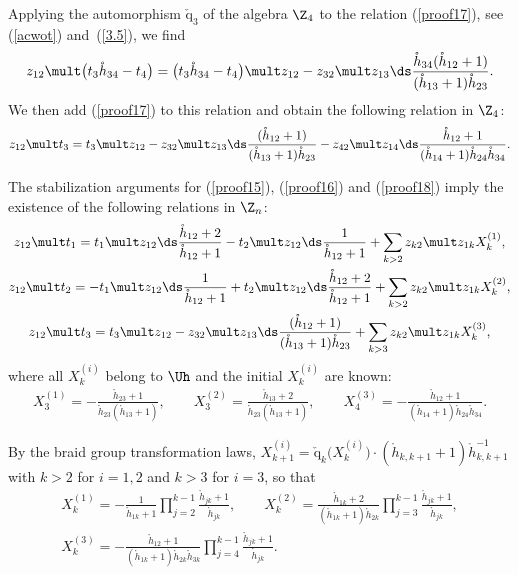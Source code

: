 \documentclass[11pt]{article}
\def\nplus{\mathfrak{n}}\def\nn{\nonumber}\def\nin{\noindent}
\def\q{\check{\mathrm q}}\def\Q{\mathrm{Q}}\def\r#1{(\ref{#1})}\let\rf=\r
\def\s{z}\def\S{\mathrm {S}}\def\si{\sigma}\def\Sp{\S^{\nplus}}\def\sy{\acute{\sigma}}\def\th{\mathring{h}}
\numberwithin{equation}{section}
\begin{document}
Applying the automorphism $\q_3$ of the algebra $\Z_4$ to the relation \rf{proof17}, see \rf{acwot} and~\rf{3.5}, we f\/ind
\begin{gather*}
\s_{12}\mult\big(t_3\th_{34}-t_4\big)=\big(t_3\th_{34}-t_4\big)\mult \s_{12}
-\s_{32}\mult\s_{13}  {\ds\frac{\th_{34}(\th_{12}+1)}{(\th_{13}+1)\th_{23}}}  .
\end{gather*}
We then add \rf{proof17} to this relation  and obtain the following relation in $\Z_4$:
\begin{gather}\label{proof18}
\s_{12}\mult t_3=t_3\mult\s_{12}
-\s_{32}\mult \s_{13}  {\ds\frac{(\th_{12}+1)}{(\th_{13}+1)\th_{23}}}-
\s_{42}\mult\s_{14}  {\ds\frac{\th_{12}+1}{(\th_{14}+1)\th_{24}\th_{34}}}  .
\end{gather}

The stabilization arguments for \rf{proof15}, \rf{proof16} and \rf{proof18} imply the existence of the following relations in $\Z_n$:
\begin{gather}\label{proof19}\s_{12}\mult t_1 =t_1\mult\s_{12}  {\ds\frac{\th_{12}+2}{\th_{12}+1}}-
t_2\mult\s_{12}  {\ds\frac{1}{\th_{12}+1}}+\sum_{k>2}\s_{k2}\mult\s_{1k}X_k^{(1)},\\
 \label{proof20}\s_{12}\mult t_2 =-t_1\mult\s_{12}  {\ds\frac{1}{\th_{12}+1}}+t_2\mult\s_{12}  {\ds\frac{\th_{12}+2}{\th_{12}+1}}
+\sum_{k>2}\s_{k2}\mult\s_{1k}X_k^{(2)},
\\
\label{proof21}\s_{12}\mult t_3 =t_3\mult\s_{12}-\s_{32}\mult\s_{13}  {\ds\frac{(\th_{12}+1)}{(\th_{13}+1)\th_{23}}}
+\sum_{k>3}\s_{k2}\mult\s_{1k}X_k^{(3)},
\end{gather}
where all $X_k^{(i)}$ belong to $\Uh$ and the initial $X_k^{(i)}$ are known:
\begin{gather*} X_3^{(1)} =-\frac{\th_{23}+1}{\th_{23}(\th_{13}+1)}  ,\qquad
X_3^{(2)} =\frac{\th_{13}+2}{\th_{23}(\th_{13}+1)}  ,\qquad
X_4^{(3)} =-\frac{\th_{12}+1}{(\th_{14}+1)\th_{24}\th_{34}}  .
\end{gather*}

By the braid group transformation laws, $X_{k+1}^{(i)}=\q_k\big(X_k^{(i)}\big)\cdot(\th_{k,k+1}+1)\th_{k,k+1}^{-1}$
with $k>2$ for $i=1,2$ and $k>3$ for $i=3$, so that
\begin{gather*}%
X_k^{(1)}=-\frac{1}{\th_{1k}+1}\prod_{j=2}^{k-1}\frac{\th_{jk}+1}{\th_{jk}} ,\qquad
X_k^{(2)}=\frac{\th_{1k}+2}{(\th_{1k}+1)\th_{2k}}\prod_{j=3}^{k-1}
\frac{\th_{jk}+1}{\th_{jk}}  ,\\
X_k^{(3)}=-\frac{\th_{12}+1}{(\th_{1k}+1)\th_{2k}\th_{3k}}\prod_{j=4}^{k-1}
\frac{\th_{jk}+1}{\th_{jk}}  .
\end{gather*}
\end{document}
